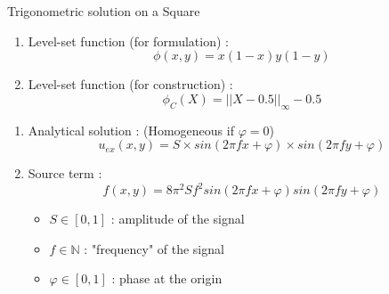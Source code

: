 \documentclass[compress,10pt,xcolor={table,dvipsnames},t]{beamer}
\begin{document}
	\begin{frame}{Trigonometric solution on a Square}
		\begin{minipage}{0.3\linewidth}
			\centering
		\end{minipage} \;
		\begin{minipage}{0.68\linewidth}
			\begin{enumerate}[\ding{217}]
				\item Level-set function (for formulation) : $$\phi(x,y)=x(1-x)y(1-y)$$
				\item Level-set function (for construction) : $$\phi_C(X)=||X-0.5||_\infty-0.5$$
				
			\end{enumerate}
		\end{minipage}

		
			\begin{enumerate}[\ding{217}]
				\item Analytical solution : (Homogeneous if $\varphi=0$)
				$$u_{ex}(x,y)=S\times sin\left(2\pi fx+\varphi\right)\times sin\left(2\pi fy+\varphi\right)$$
				\item Source term : $$f(x,y)=8\pi^2 Sf^2sin\left(2\pi fx + \varphi\right)sin\left(2\pi fy + \varphi\right)$$
				\begin{minipage}{0.48\linewidth}
					\begin{itemize}
						\item $S\in[0,1]$ : amplitude of the signal 
						\item $f\in\mathbb{N}$ : "frequency" of the signal
						\item $\varphi\in[0,1]$ : phase at the origin
					\end{itemize}
				\end{minipage} \;
				\begin{minipage}{0.48\linewidth}
					\centering
				\end{minipage}
			\end{enumerate}
	\end{frame}
\end{document}
